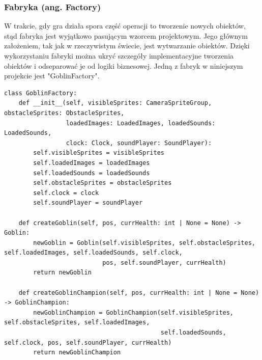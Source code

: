 \documentclass{article}
\begin{document}
\subsubsection{Fabryka (ang. Factory) \cite{wiki:Factory}}
W trakcie, gdy gra działa spora część operacji to tworzenie nowych obiektów, stąd fabryka jest wyjątkowo pasującym wzorcem projektowym. Jego głównym założeniem, tak jak w rzeczywistym świecie, jest wytwarzanie obiektów. Dzięki wykorzystaniu fabryki można ukryć szczegóły implementacyjne tworzenia obiektów i odseparować je od logiki biznesowej. Jedną z fabryk w niniejszym projekcie jest "GoblinFactory".
\begin{center}
    \begin{lstlisting}[language=pythonSchema]
class GoblinFactory:
    def __init__(self, visibleSprites: CameraSpriteGroup, obstacleSprites: ObstacleSprites,
                 loadedImages: LoadedImages, loadedSounds: LoadedSounds,
                 clock: Clock, soundPlayer: SoundPlayer):
        self.visibleSprites = visibleSprites
        self.loadedImages = loadedImages
        self.loadedSounds = loadedSounds
        self.obstacleSprites = obstacleSprites
        self.clock = clock
        self.soundPlayer = soundPlayer

    def createGoblin(self, pos, currHealth: int | None = None) -> Goblin:
        newGoblin = Goblin(self.visibleSprites, self.obstacleSprites, self.loadedImages, self.loadedSounds, self.clock,
                           pos, self.soundPlayer, currHealth)
        return newGoblin

    def createGoblinChampion(self, pos, currHealth: int | None = None) -> GoblinChampion:
        newGoblinChampion = GoblinChampion(self.visibleSprites, self.obstacleSprites, self.loadedImages,
                                           self.loadedSounds, self.clock, pos, self.soundPlayer, currHealth)
        return newGoblinChampion
    \end{lstlisting}
\end{center}
\newpage
\end{document}
